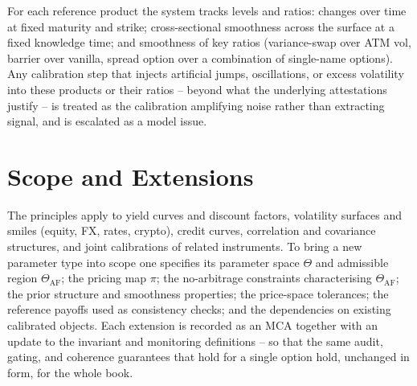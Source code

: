 \documentclass[11pt]{book}
\theoremstyle{plain}
\theoremstyle{definition}
\theoremstyle{remark}
\begin{document}
For each reference product the system tracks levels and ratios: changes over time
at fixed maturity and strike; cross-sectional smoothness across the surface at a
fixed knowledge time; and smoothness of key ratios (variance-swap over ATM vol,
barrier over vanilla, spread option over a combination of single-name options).
Any calibration step that injects artificial jumps, oscillations, or excess
volatility into these products or their ratios -- beyond what the underlying
attestations justify -- is treated as the calibration amplifying noise rather than
extracting signal, and is escalated as a model issue.

\section{Scope and Extensions}

The principles apply to yield curves and discount factors, volatility surfaces and
smiles (equity, FX, rates, crypto), credit curves, correlation and covariance
structures, and joint calibrations of related instruments. To bring a new
parameter type into scope one specifies its parameter space $\Theta$ and
admissible region $\Theta_{\mathrm{AF}}$; the pricing map $\pi$; the
no-arbitrage constraints characterising $\Theta_{\mathrm{AF}}$; the prior
structure and smoothness properties; the price-space tolerances; the reference
payoffs used as consistency checks; and the dependencies on existing calibrated
objects. Each extension is recorded as an MCA together with an update to the
invariant and monitoring definitions -- so that the same audit, gating, and
coherence guarantees that hold for a single option hold, unchanged in form, for
the whole book.
\end{document}

